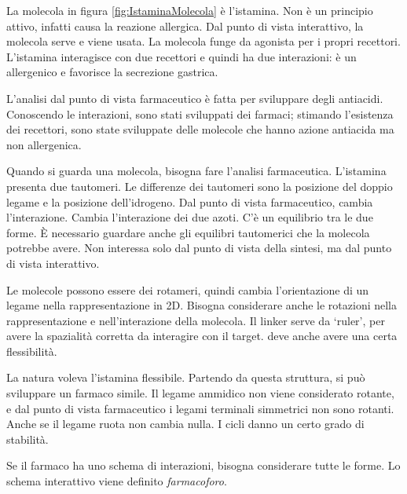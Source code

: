 
La molecola in figura \ref{fig:IstaminaMolecola} è l'istamina. Non è un principio attivo,
infatti causa la reazione allergica. Dal punto di vista interattivo, la
molecola serve e viene usata. La molecola funge da agonista per i propri
recettori.
L'istamina interagisce con due recettori e quindi ha due interazioni: è un allergenico e favorisce la secrezione gastrica.

L'analisi dal punto di vista farmaceutico è fatta per sviluppare degli
antiacidi. Conoscendo le interazioni, sono stati sviluppati dei farmaci;
stimando l'esistenza dei recettori, sono state sviluppate delle molecole
che hanno azione antiacida ma non allergenica.

Quando si guarda una molecola, bisogna fare l'analisi farmaceutica.
L'istamina presenta due tautomeri. Le differenze dei tautomeri sono la
posizione del doppio legame e la posizione dell'idrogeno. Dal punto di
vista farmaceutico, cambia l'interazione. Cambia l'interazione dei due
azoti. C'è un equilibrio tra le due forme. È necessario guardare anche
gli equilibri tautomerici che la molecola potrebbe avere. Non interessa
solo dal punto di vista della sintesi, ma dal punto di vista
interattivo.


Le molecole possono essere dei rotameri, quindi cambia l'orientazione di
un legame nella rappresentazione in 2D. Bisogna considerare anche le
rotazioni nella rappresentazione e nell'interazione della molecola.
Il linker serve da `ruler', per avere la spazialità corretta da
interagire con il target. deve anche avere una certa flessibilità.


La natura voleva l'istamina flessibile. Partendo da questa struttura, si
può sviluppare un farmaco simile.
Il legame ammidico non viene considerato rotante, e dal punto di vista
farmaceutico i legami terminali simmetrici non sono rotanti. Anche se il
legame ruota non cambia nulla.
I cicli danno un certo grado di stabilità.

Se il farmaco ha uno schema di interazioni, bisogna considerare tutte le
forme. Lo schema interattivo viene definito \emph{farmacoforo}.



